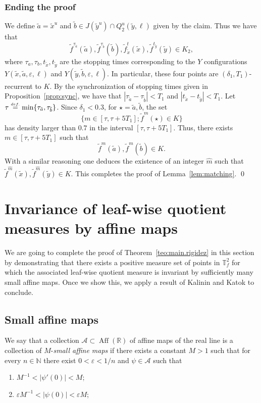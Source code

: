 \documentclass[a4paper,11pt,reqno]{amsart}
\newcommand{\R}{{\mathbb R}}
\newcommand{\N}{{\mathbb N}}
\newcommand{\TTf}{{\mathbb{T}_f^2}}
\newcommand{\cA}{{\mathcal A}}
\newcommand{\eps}{\varepsilon}
\newcommand{\eqdef}{\stackrel{\scriptscriptstyle\textrm def.}{=}}
\newcommand{\tix}{\tilde{x}}
\newcommand{\ta}{\tilde{a}}
\newcommand{\tb}{\tilde{b}}
\newcommand{\tif}{\tilde{f}}
\theoremstyle{definition}
\begin{document}
\subsubsection{Ending the proof}
    We define $\ta=\tix^u$ and $\tb\in J(\tilde{y}^u)\cap Q^u_2(\tilde{y},\ell)$ given by the claim. Thus we have that 
    \[
    \tif^{\tau_{\ta}}(\ta),\tif^{\tau_{\tb}}(\tb), \tif^t_{\tix}(\tix),\tif^{t_{\tilde{y}}}(\tilde{y})\in K_2,
    \]
    where $\tau_a,\tau_b,t_{\tix},t_{\tilde{y}}$ are the stopping times corresponding to the $Y$ configurations $Y(\tix,\ta,\eps,\ell)$ and $Y(\tilde{y},\tb,\eps,\ell)$. In particular, these four points are $(\delta_1,T_1)$-recurrent to $K$. By the synchronization of stopping times given in Proposition~\ref{prop:sync}, we have that $|\tau_{\ta}-\tau_{\tb}|<T_1$ and $|t_{\tix}-t_{\tilde{y}}|<T_1$. Let $\tau\eqdef\min\{\tau_{\ta},\tau_{\tb}\}$. Since $\delta_1<0.3$, for $\star=\ta,\tb$, the set 
    \[
    \{m\in[\tau,\tau+5T_1];\tif^m(\star)\in K\}
    \]
    has density larger than $0.7$ in the interval $[\tau,\tau+5T_1]$. Thus, there exists $m\in[\tau,\tau+5T_1]$ such that 
    \[
    \tif^m(\ta),\tif^m(\tb)\in K.
    \]
   With a similar reasoning one deduces the existence of an integer $\hat{m}$ such that $\tif^{\hat{m}}(\tix),\tif^{\hat{m}}(\tilde{y})\in K$. This completes the proof of Lemma~\ref{lem:matching}. \qed



\section{Invariance of leaf-wise quotient measures by affine maps}
\label{sec:proof-main-lemma2}

We are going to complete the proof of Theorem~\ref{teo:main.rigidez} in this section by demonstrating that there exists a positive measure set of points in $\TTf$ for which the associated leaf-wise quotient measure is invariant by sufficiently many small affine maps. Once we show this, we apply a result of Kalinin and Katok to conclude.  

\subsection{Small affine maps}

We say that a collection $\cA\subset\operatorname{Aff}(\R)$ of affine maps of the real line is a collection of $M$-\emph{small affine maps} if there exists a constant $M>1$ such that for every $n\in\N$ there exist $0<\eps<1/n$ and $\psi\in\cA$ such that
\begin{enumerate}
        \item $M^{-1} < \vert \psi'(0) \vert < M$; 
        \item $\varepsilon M^{-1} < \vert \psi(0) \vert < \varepsilon M$;
\end{enumerate}
\end{document}
